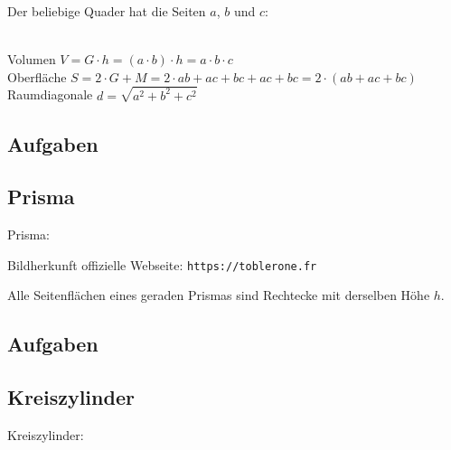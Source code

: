 
Der beliebige Quader hat die Seiten $a$, $b$ und $c$:
\begin{gesetz}{}{}\\
  Volumen $V = G\cdot{} h = (a\cdot{}b)\cdot{}h = a\cdot{}b\cdot{}c$\\
  Oberfläche $S=2\cdot{}G + M = 2\cdot{}ab + ac + bc + ac + bc = 2\cdot{}(ab + ac + bc)$\\
  Raumdiagonale $d = \sqrt{a^2 + b^2 + c^2}$
\end{gesetz}

\subsection*{Aufgaben}
\newpage



\subsection{Prisma}
Prisma: \\

\begin{center}Bildherkunft offizielle Webseite: \texttt{https://toblerone.fr}\end{center}


\begin{bemerkung}{}{}
  Alle Seitenflächen eines geraden Prismas sind Rechtecke mit derselben Höhe $h$.
  \end{bemerkung}

\subsection*{Aufgaben}

\newpage


\subsection{Kreiszylinder}

Kreiszylinder: 


